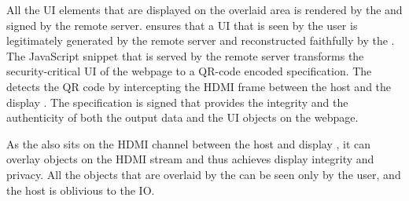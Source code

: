 \myparagraph{\Poui} All the UI elements that are displayed on the overlaid area is rendered by the \device and signed by the remote server. \Poui ensures that a UI that is seen by the user is legitimately generated by the remote server and reconstructed faithfully by the \device. The JavaScript snippet that is served by the remote server transforms the security-critical UI of the webpage to a QR-code encoded specification. The \device detects the QR code by intercepting the HDMI frame between the host and the display \device. The specification is signed that provides the integrity and the authenticity of both the output data and the UI objects on the webpage. 

 As the \device also sits on the HDMI channel between the host and display \device, it can overlay objects on the HDMI stream and thus achieves display integrity and privacy. All the objects that are overlaid by the \device can be seen only by the user, and the host is oblivious to the IO.


\fi